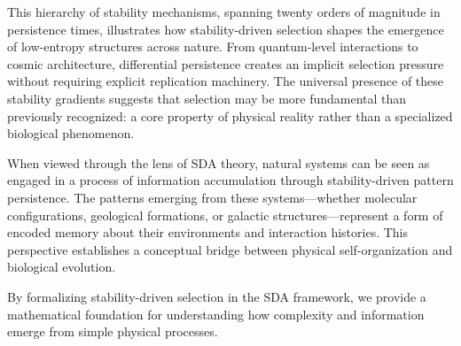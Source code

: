 \documentclass[preprint,12pt]{elsarticle}
\begin{document}
This hierarchy of stability mechanisms, spanning twenty orders of magnitude in persistence times, illustrates how stability-driven selection shapes the emergence of low-entropy structures across nature. From quantum-level interactions to cosmic architecture, differential persistence creates an implicit selection pressure without requiring explicit replication machinery. The universal presence of these stability gradients suggests that selection may be more fundamental than previously recognized: a core property of physical reality rather than a specialized biological phenomenon.

When viewed through the lens of SDA theory, natural systems can be seen as engaged in a process of information accumulation through stability-driven pattern persistence. The patterns emerging from these systems—whether molecular configurations, geological formations, or galactic structures—represent a form of encoded memory about their environments and interaction histories. This perspective establishes a conceptual bridge between physical self-organization and biological evolution.

By formalizing stability-driven selection in the SDA framework, we provide a mathematical foundation for understanding how complexity and information emerge from simple physical processes.
\end{document}

